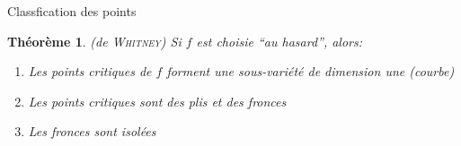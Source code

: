 \documentclass[compress]{beamer}
\newtheorem{thm}{Théorème}
\theoremstyle{definition}
\begin{document}
\begin{frame}{Classfication des points}
    \begin{thm}{(de \textsc{Whitney})}
        Si $f$ est choisie ``au hasard'', alors:
        \begin{enumerate}[<+->]
            \item Les points critiques de $f$ forment une sous-variété de dimension une (\alert{courbe})
            \item Les points critiques sont des plis et des fronces
            \item Les fronces sont isolées
        \end{enumerate}
    \end{thm}
\end{frame}
\end{document}
